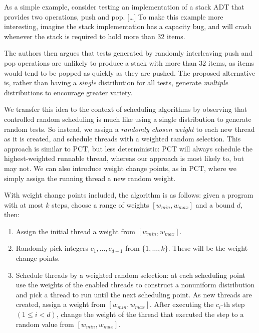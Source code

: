 \begin{displayquote}
  As a simple example, consider testing an implementation of a stack ADT that
  provides two operations, push and pop. [\ldots] To make this example more
  interesting, imagine the stack implementation has a capacity bug, and will
  crash whenever the stack is required to hold more than 32
  items. \parencite{groce2012}
\end{displayquote}

The authors then argues that tests generated by randomly interleaving
push and pop operations are unlikely to produce a stack with more than
32 items, as items would tend to be popped as quickly as they are
pushed.  The proposed alternative is, rather than having a
\emph{single} distribution for all tests, generate \emph{multiple}
distributions to encourage greater variety.

We transfer this idea to the context of scheduling algorithms by
observing that controlled random scheduling is much like using a
single distribution to generate random tests.  So instead, we assign a
\emph{randomly chosen weight} to each new thread as it is created,
and schedule threads with a weighted random selection.  This approach
is similar to PCT, but less deterministic: PCT will always schedule
the highest-weighted runnable thread, whereas our approach is most
likely to, but may not.  We can also introduce weight change points,
as in PCT, where we simply assign the running thread a new random
weight.

With weight change points included, the algorithm is as follows: given a program
with at most $k$ steps, choose a range of weights $[w_{min}, w_{max}]$ and
a bound $d$, then:

\begin{enumerate}
\item Assign the initial thread a weight from $[w_{min}, w_{max}]$.
\item Randomly pick integers $c_1, \ldots, c_{d-1}$ from $\{1, \ldots, k\}$.
These will be the weight change points.
\item Schedule threads by a weighted random selection: at each scheduling point
use the weights of the enabled threads to construct a nonuniform distribution
and pick a thread to run until the next scheduling point.  As new threads are
created, assign a weight from $[w_{min}, w_{max}]$.  After executing
the $c_i$-th step $(1 \leq i < d)$, change the weight of the thread that
executed the step to a random value from $[w_{min}, w_{max}]$.
\end{enumerate}

